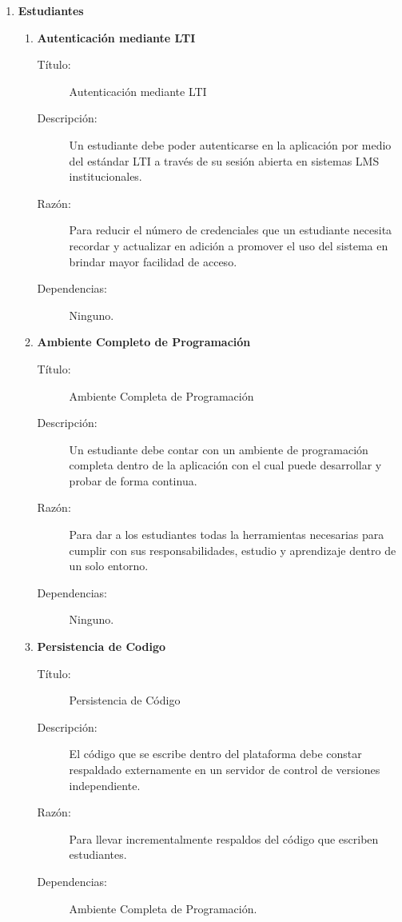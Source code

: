 \begin{enumerate}
	\item \textbf{Estudiantes}
	\begin{enumerate}
		\item \textbf{Autenticación mediante LTI}
		\begin{description}
			\item[Título:] Autenticación mediante LTI
			\item[Descripción:] Un estudiante debe poder autenticarse en la aplicación por medio del estándar LTI a través de su sesión abierta en sistemas LMS institucionales.
			\item[Razón:] Para reducir el número de credenciales que un estudiante necesita recordar y actualizar en adición a promover el uso del sistema en brindar mayor facilidad de acceso.
			\item[Dependencias:] Ninguno.
		\end{description}
		\item \textbf{Ambiente Completo de Programación}
		\begin{description}
			\item[Título:] Ambiente Completa de Programación
			\item[Descripción:] Un estudiante debe contar con un ambiente de programación completa dentro de la aplicación con el cual puede desarrollar y probar de forma continua.
			\item[Razón:] Para dar a los estudiantes todas la herramientas necesarias para cumplir con sus responsabilidades, estudio y aprendizaje dentro de un solo entorno.
			\item[Dependencias:] Ninguno.
		\end{description}
		\item \textbf{Persistencia de Codigo}
		\begin{description}
			\item[Título:] Persistencia de Código
			\item[Descripción:] El código que se escribe dentro del plataforma debe constar respaldado externamente en un servidor de control de versiones independiente.
			\item[Razón:] Para llevar incrementalmente respaldos del código que escriben estudiantes.
			\item[Dependencias:] Ambiente Completa de Programación.

\end{description}
\end{enumerate}
\end{enumerate}
